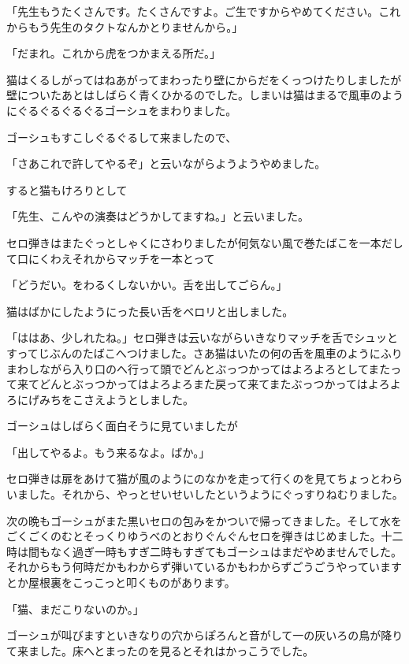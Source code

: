 \documentclass[uplatex,a5paper,twoside]{jsarticle}
\begin{document}
「先生もうたくさんです。たくさんですよ。ご生ですからやめてください。これからもう先生のタクトなんかとりませんから。」

「だまれ。これから虎をつかまえる所だ。」

猫はくるしがってはねあがってまわったり壁にからだをくっつけたりしましたが壁についたあとはしばらく青くひかるのでした。しまいは猫はまるで風車のようにぐるぐるぐるぐるゴーシュをまわりました。

ゴーシュもすこしぐるぐるして来ましたので、

「さあこれで許してやるぞ」と云いながらようようやめました。

すると猫もけろりとして

「先生、こんやの演奏はどうかしてますね。」と云いました。

セロ弾きはまたぐっとしゃくにさわりましたが何気ない風で巻たばこを一本だして口にくわえそれからマッチを一本とって

「どうだい。をわるくしないかい。舌を出してごらん。」

猫はばかにしたようにった長い舌をベロリと出しました。

「ははあ、少しれたね。」セロ弾きは云いながらいきなりマッチを舌でシュッとすってじぶんのたばこへつけました。さあ猫はいたの何の舌を風車のようにふりまわしながら入り口のへ行って頭でどんとぶっつかってはよろよろとしてまたって来てどんとぶっつかってはよろよろまた戻って来てまたぶっつかってはよろよろにげみちをこさえようとしました。

ゴーシュはしばらく面白そうに見ていましたが

「出してやるよ。もう来るなよ。ばか。」

セロ弾きは扉をあけて猫が風のようにのなかを走って行くのを見てちょっとわらいました。それから、やっとせいせいしたというようにぐっすりねむりました。

次の晩もゴーシュがまた黒いセロの包みをかついで帰ってきました。そして水をごくごくのむとそっくりゆうべのとおりぐんぐんセロを弾きはじめました。十二時は間もなく過ぎ一時もすぎ二時もすぎてもゴーシュはまだやめませんでした。それからもう何時だかもわからず弾いているかもわからずごうごうやっていますとか屋根裏をこっこっと叩くものがあります。

「猫、まだこりないのか。」

ゴーシュが叫びますといきなりの穴からぽろんと音がして一の灰いろの鳥が降りて来ました。床へとまったのを見るとそれはかっこうでした。
\end{document}
